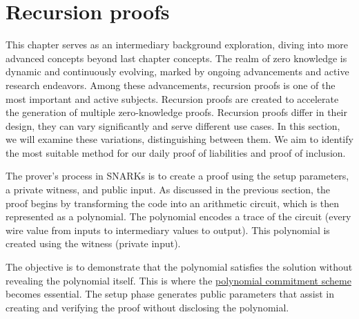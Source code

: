 


\chapter{Recursion proofs}

This chapter serves as an intermediary background exploration,
diving into more advanced concepts beyond last chapter concepts.
The realm of zero knowledge is dynamic and continuously evolving,
marked by ongoing advancements and active research endeavors. Among these advancements,
recursion proofs is one of the most important and active subjects. Recursion proofs are created to accelerate
the generation of multiple zero-knowledge proofs.
Recursion proofs differ in their design, they can vary significantly and serve different use cases.
In this section, we will examine these variations, distinguishing between them.
We aim to identify the most suitable method for our daily proof of liabilities and proof of inclusion. \cite{Nova23}


The prover's process in SNARKs is to create a proof using the setup parameters, a private witness, and public input. 
As discussed in the previous section, the proof begins by transforming the code into an arithmetic circuit, 
which is then represented as a polynomial. The polynomial encodes a trace of the circuit (every wire value from inputs to intermediary values to output).
This polynomial is created using the witness (private input).

The objective is to demonstrate that the polynomial satisfies the solution without revealing the polynomial itself. 
This is where the \hyperref[subsec:pc]{polynomial commitment scheme} becomes essential. 
The setup phase generates public parameters that assist in creating and verifying the proof without disclosing the polynomial.

